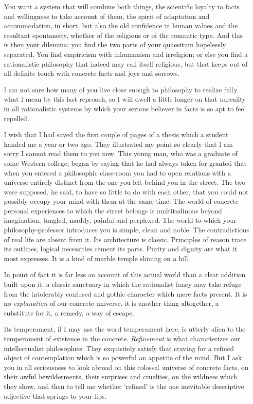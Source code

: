 \documentclass[]{article}
\begin{document}
You want a system that will combine both things, the scientific
loyalty to facts and willingness to take account of them, the spirit of
adaptation and accommodation, in short, but also the old confidence in
human values and the resultant spontaneity, whether of the religious or
of the romantic type. And this is then your dilemma: you find the two
parts of your quaesitum hopelessly separated. You find empiricism with
inhumanism and irreligion; or else you find a rationalistic philosophy
that indeed may call itself religious, but that keeps out of all
definite touch with concrete facts and joys and sorrows.

I am not sure how many of you live close enough to philosophy to realize
fully what I mean by this last reproach, so I will dwell a little longer
on that unreality in all rationalistic systems by which your serious
believer in facts is so apt to feel repelled.

I wish that I had saved the first couple of pages of a thesis which
a student handed me a year or two ago. They illustrated my point so
clearly that I am sorry I cannot read them to you now. This young man,
who was a graduate of some Western college, began by saying that he had
always taken for granted that when you entered a philosophic class-room
you had to open relations with a universe entirely distinct from the one
you left behind you in the street. The two were supposed, he said, to
have so little to do with each other, that you could not possibly occupy
your mind with them at the same time. The world of concrete personal
experiences to which the street belongs is multitudinous beyond
imagination, tangled, muddy, painful and perplexed. The world to which
your philosophy-professor introduces you is simple, clean and noble.
The contradictions of real life are absent from it. Its architecture is
classic. Principles of reason trace its outlines, logical necessities
cement its parts. Purity and dignity are what it most expresses. It is a
kind of marble temple shining on a hill.

In point of fact it is far less an account of this actual world than
a clear addition built upon it, a classic sanctuary in which the
rationalist fancy may take refuge from the intolerably confused and
gothic character which mere facts present. It is no \emph{explanation} of our
concrete universe, it is another thing altogether, a substitute for it,
a remedy, a way of escape.

Its temperament, if I may use the word temperament here, is utterly
alien to the temperament of existence in the concrete. \emph{Refinement} is
what characterizes our intellectualist philosophies. They exquisitely
satisfy that craving for a refined object of contemplation which is so
powerful an appetite of the mind. But I ask you in all seriousness to
look abroad on this colossal universe of concrete facts, on their awful
bewilderments, their surprises and cruelties, on the wildness which
they show, and then to tell me whether `refined' is the one inevitable
descriptive adjective that springs to your lips.
\end{document}
